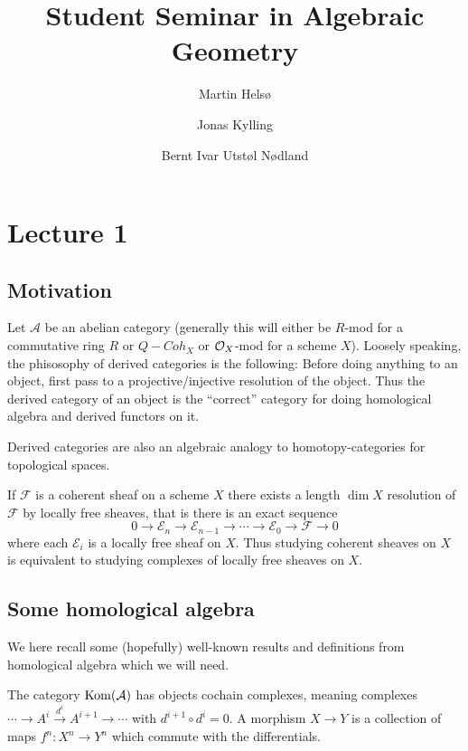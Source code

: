 \documentclass[a4paper, UKenglish]{report}
\title
{
    \bfseries\sffamily
    Student Seminar in Algebraic Geometry
}
\author
{
    Martin Hels\o
    \and
    Jonas Kylling
    \and
    Bernt Ivar Utst\o l N\o dland
}
\begin{document}
\begin{titlepage}
    \maketitle
\end{titlepage}

\chapter{Lecture 1}

\section{Motivation}

Let $\mathcal{A}$ be an abelian category (generally this will either be $R$-mod for a commutative ring $R$ or $Q-Coh_X$ or $\mathcal{O}_X$-mod for a scheme $X$). Loosely speaking, the phisosophy of derived categories is the following: Before doing anything to an object, first pass to a projective/injective resolution of the object. Thus the derived category of an object is the ``correct'' category for doing homological algebra and derived functors on it.

Derived categories are also an algebraic analogy to homotopy-categories for topological spaces.

\begin{example}
If $\mathcal{F}$ is a coherent sheaf on a scheme $X$ there exists a length $\dim X$ resolution of $\mathcal{F}$ by locally free sheaves, that is there is an exact sequence
\[ 0 \to \mathcal{E}_n \to \mathcal{E}_{n-1} \to \cdots \to \mathcal{E}_0 \to \mathcal{F} \to 0 \]
where each $\mathcal{E}_i$ is a locally free sheaf on $X$. Thus studying coherent sheaves on $X$ is equivalent to studying complexes of locally free sheaves on $X$.
\end{example}

\section{Some homological algebra}

We here recall some (hopefully) well-known results and definitions from homological algebra which we will need.

The category $\operatorname{Kom}(\mathcal{A})$ has objects cochain complexes, meaning complexes $ \cdots \to A^i \xrightarrow{d^i} A^{i+1} \to \cdots$  with $d^{i+1} \circ d^i = 0$. A morphism  $X \to Y$ is a collection of maps $f^n: X^n \to Y^n$ which commute with the differentials.
\end{document}
